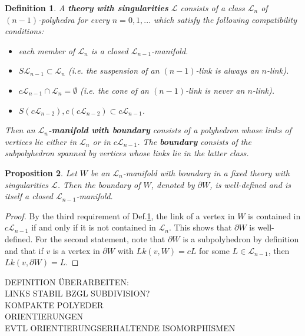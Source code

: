 \documentclass{scrreprt}
\newtheorem{prop}{Proposition}[chapter]
\newtheorem{definition}[prop]{Definition}
\begin{document}
\begin{definition}\label{theory}
A \textbf{theory with singularities} $\mathcal{L}$ consists of a class $\mathcal{L}_n$ of $(n-1)$-polyhedra for every $n=0,1,...$ which satisfy the following compatibility conditions:
\begin{itemize}
\item[1.] each member of $\mathcal{L}_n$ is a closed $\mathcal{L}_{n-1}$-manifold.
\item[2.] $S \mathcal{L}_{n-1} \subset \mathcal{L}_n$ (i.e. the suspension of an $(n-1)$-link is always an $n$-link).
\item[3.] $c \mathcal{L}_{n-1} \cap \mathcal{L}_n = \emptyset$ (i.e. the cone of an $(n-1)$-link is never an $n$-link).
\item[4.] $S(c\mathcal{L}_{n-2}), c(c \mathcal{L}_{n-2}) \subset c \mathcal{L}_{n-1}$.
\end{itemize}
Then an \textbf{$\mathcal{L}_n$-manifold with boundary} consists of a polyhedron whose links of vertices lie either in $\mathcal{L}_n$ or in $c \mathcal{L}_{n-1}$. The \textbf{boundary} consists of the subpolyhedron spanned by vertices whose links lie in the latter class.
\end{definition}

\begin{prop}
Let $W$ be an $\mathcal{L}_n$-manifold with boundary in a fixed theory with singularities $\mathcal{L}$. Then the boundary of $W$, denoted by $\partial W$, is well-defined and is itself a closed $\mathcal{L}_{n-1}$-manifold.
\end{prop}

\begin{proof}
By the third requirement of Def.\ref{theory}, the link of a vertex in $W$ is contained in $c \mathcal{L}_{n-1}$ if and only if it is not contained in $\mathcal{L}_n$. This shows that $\partial W$ is well-defined. For the second statement, note that $\partial W$ is a subpolyhedron by definition and that if $v$ is a vertex in $\partial W$ with $Lk(v,W)=cL$ for some $L \in \mathcal{L}_{n-1}$, then $Lk(v,\partial W) = L$.
\end{proof}

DEFINITION ÜBERARBEITEN: \\
LINKS STABIL BZGL SUBDIVISION? \\
KOMPAKTE POLYEDER \\
ORIENTIERUNGEN \\
EVTL ORIENTIERUNGSERHALTENDE ISOMORPHISMEN 
\end{document}
